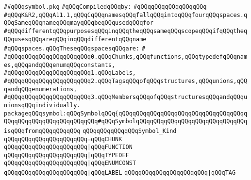\label{src/lib/c-kit/src/ast/symbol.pkg}
\verb|##qQQqsymbol.pkg|\newline
\newline
\verb|#qQQqCompiledqQQqby:|\newline
\verb|#qQQqqQQqqQQqqQQqqQQq|\newline
\newline
\verb|#qQQqK&R2,qQQqA11.1,qQQqCqQQqnamesqQQqfallqQQqintoqQQqfourqQQqspaces.qQQqSameqQQqnameqQQqmayqQQqbeqQQqusedqQQqfor|\newline
\verb|#qQQqdifferentqQQqpurposesqQQqinqQQqtheqQQqsameqQQqscopeqQQqifqQQqtheqQQqusesqQQqareqQQqinqQQqdifferentqQQqname|\newline
\verb|#qQQqspaces.qQQqTheseqQQqspacesqQQqare:|\newline
\verb|#|\newline
\verb|#qQQqqQQqqQQqqQQqqQQqqQQq0.qQQqChunks,qQQqfunctions,qQQqtypedefqQQqnames,qQQqandqQQqenumqQQqconstants,|\newline
\verb|#qQQqqQQqqQQqqQQqqQQqqQQq1.qQQqLabels,|\newline
\verb|#qQQqqQQqqQQqqQQqqQQqqQQq2.qQQqTagsqQQqofqQQqstructures,qQQqunions,qQQqandqQQqenumerations,|\newline
\verb|#qQQqqQQqqQQqqQQqqQQqqQQq3.qQQqMembersqQQqofqQQqstructuresqQQqandqQQqunionsqQQqindividually.|\newline
\newline
\newline
\newline
\verb|packageqQQqsymbol:qQQqSymbolqQQq{qQQqqQQqqQQqqQQqqQQqqQQqqQQqqQQqqQQqqQQqqQQqqQQqqQQqqQQqqQQqqQQq#qQQqSymbolqQQqqQQqqQQqqQQqqQQqqQQqqQQqqQQqisqQQqfromqQQqqQQqqQQq|\newline
\newline
\verb|qQQqqQQqqQQqqQQqSymbol_Kind|\newline
\verb|qQQqqQQqqQQqqQQqqQQqqQQq=qQQqCHUNK|\newline
\verb|qQQqqQQqqQQqqQQqqQQqqQQq|\verb#|qQQqFUNCTION#\newline
\verb|qQQqqQQqqQQqqQQqqQQqqQQq|\verb#|qQQqTYPEDEF#\newline
\verb|qQQqqQQqqQQqqQQqqQQqqQQq|\verb#|qQQqENUMCONST#\newline
\verb|qQQqqQQqqQQqqQQqqQQqqQQq|\verb#|qQQqLABEL#\newline
\verb|qQQqqQQqqQQqqQQqqQQqqQQq|\verb#|qQQqTAG#\newline
